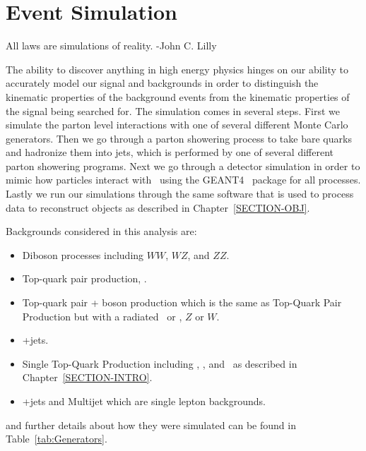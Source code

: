 \chapter{Event Simulation}
\label{SECTION-EVENTSIMULATION}

All laws are simulations of reality. -John C. Lilly

\vspace{5mm} %

The ability to discover anything in high energy physics hinges on our ability to accurately model our signal and backgrounds in order to distinguish the kinematic properties of the background events from the kinematic properties of the signal being searched for. The simulation comes in several steps. First we simulate the parton level interactions with one of several different Monte Carlo generators. Then we go through a parton showering process to take bare quarks and hadronize them into jets, which is performed by one of several different parton showering programs. Next we go through a detector simulation in order to mimic how particles interact with \atlas~using the GEANT4~\cite{geant4} package for all processes. Lastly we run our simulations through the same software that is used to process data to reconstruct objects as described in Chapter~\ref{SECTION-OBJ}. 

Backgrounds considered in this analysis are: 

\begin{itemize}

\item Diboson processes including $WW$, $WZ$, and $ZZ$.
\item Top-quark pair production, \TTB.
\item Top-quark pair + boson production which is the same as Top-Quark Pair Production but with a radiated \aw~or \az, \TTB $Z$ or \TTB $W$.
\item \az +jets.
\item Single Top-Quark Production including \schan, \tchan, and \Wt~as described in Chapter~\ref{SECTION-INTRO}.
\item \aw +jets and Multijet which are single lepton backgrounds.

\end{itemize}

\noindent and further details about how they were simulated can be found in Table~\ref{tab:Generators}. 

